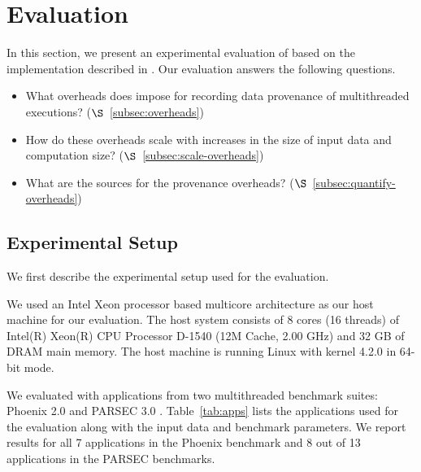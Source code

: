 \section{Evaluation}
\label{sec:evaluation}

In this section, we present an experimental evaluation of \projecttitle based on the implementation described in  . Our evaluation answers the following questions.

\begin{itemize}
\item What overheads does \projecttitle impose for recording data provenance of multithreaded executions? ($\S$~\ref{subsec:overheads})
\item How do these overheads scale with increases in the size of input data and computation size? ($\S$~\ref{subsec:scale-overheads})
\item What are the sources for the provenance overheads? ($\S$~\ref{subsec:quantify-overheads})
\end{itemize}



\subsection{Experimental Setup}
We first describe the experimental setup used for the evaluation.

 We used an Intel Xeon processor based
multicore architecture as our host machine for our evaluation. The
host system consists of 8 cores (16 threads) of Intel(R) Xeon(R) CPU Processor D-1540
(12M Cache, 2.00 GHz) and 32 GB of DRAM main memory. The host
machine is running Linux with kernel 4.2.0 in 64-bit mode.


  We evaluated \projecttitle with applications from two multithreaded benchmark suites: Phoenix 2.0 \cite{phoenix} and PARSEC 3.0 \cite{parsec}. Table~\ref{tab:apps} lists the applications used for the evaluation along with the input data and benchmark parameters.  We report results for all 7 applications in the Phoenix benchmark and 8 out of 13 applications in the PARSEC benchmarks. %




